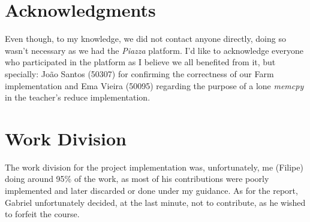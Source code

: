 \documentclass[10pt,journal]{IEEEtran}
\begin{document}
\section{Acknowledgments}

Even though, to my knowledge, we did not contact anyone directly, doing so wasn't necessary as we had the \textit{Piazza} platform. I'd like to acknowledge everyone who participated in the platform as I believe we all benefited from it, but specially: João Santos (50307) for confirming the correctness of our Farm implementation and Ema Vieira (50095) regarding the purpose of a lone \textit{memcpy} in the teacher's reduce implementation.

\section{Work Division}

The work division for the project implementation was, unfortunately, me (Filipe) doing around 95\% of the work, as most of his contributions were poorly implemented and later discarded or done under my guidance. As for the report, Gabriel unfortunately decided, at the last minute, not to contribute, as he wished to forfeit the course.


{}
\end{document}

